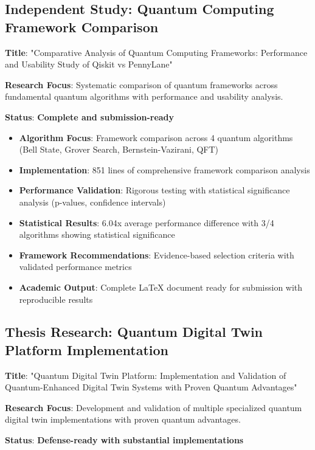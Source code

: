 \documentclass[12pt,a4paper]{article}
\begin{document}
\subsection{Independent Study: Quantum Computing Framework Comparison}

\textbf{Title}: "Comparative Analysis of Quantum Computing Frameworks: Performance and Usability Study of Qiskit vs PennyLane"

\textbf{Research Focus}: Systematic comparison of quantum frameworks across fundamental quantum algorithms with performance and usability analysis.

\textbf{Status}: \textcolor{successgreen}{\textbf{Complete and submission-ready}}

\begin{itemize}
    \item \textbf{Algorithm Focus}: Framework comparison across 4 quantum algorithms (Bell State, Grover Search, Bernstein-Vazirani, QFT)
    \item \textbf{Implementation}: 851 lines of comprehensive framework comparison analysis
    \item \textbf{Performance Validation}: Rigorous testing with statistical significance analysis (p-values, confidence intervals)
    \item \textbf{Statistical Results}: 6.04x average performance difference with 3/4 algorithms showing statistical significance  
    \item \textbf{Framework Recommendations}: Evidence-based selection criteria with validated performance metrics
    \item \textbf{Academic Output}: Complete LaTeX document ready for submission with reproducible results
\end{itemize}

\subsection{Thesis Research: Quantum Digital Twin Platform Implementation}

\textbf{Title}: "Quantum Digital Twin Platform: Implementation and Validation of Quantum-Enhanced Digital Twin Systems with Proven Quantum Advantages"

\textbf{Research Focus}: Development and validation of multiple specialized quantum digital twin implementations with proven quantum advantages.

\textbf{Status}: \textcolor{successgreen}{\textbf{Defense-ready with substantial implementations}}
\end{document}
